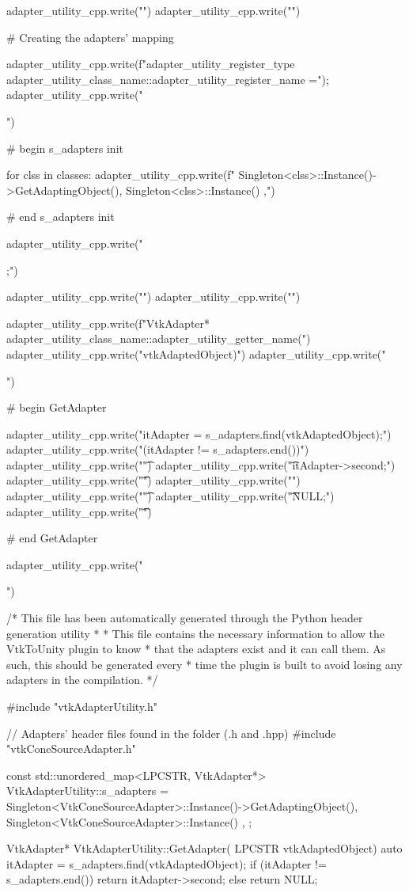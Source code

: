 \begin{appendices}
\begin{python}[label=lst:generateheader,caption={generate-header.py script},aboveskip=20pt]
adapter_utility_cpp.write("\n")
adapter_utility_cpp.write("\n")

# Creating the adapters' mapping

adapter_utility_cpp.write(f"{adapter_utility_register_type} {adapter_utility_class_name}::{adapter_utility_register_name} =");
adapter_utility_cpp.write("{\n")

# begin s_adapters init

for clss in classes:    
    adapter_utility_cpp.write(f"\t{{ Singleton<{clss}>::Instance()->GetAdaptingObject(), Singleton<{clss}>::Instance() }},\n")

# end s_adapters init

adapter_utility_cpp.write("};\n")

adapter_utility_cpp.write("\n")
adapter_utility_cpp.write("\n")

adapter_utility_cpp.write(f"VtkAdapter* {adapter_utility_class_name}::{adapter_utility_getter_name}(\n")
adapter_utility_cpp.write("\tLPCSTR vtkAdaptedObject)\n")
adapter_utility_cpp.write("{\n")

# begin GetAdapter

adapter_utility_cpp.write("\tauto itAdapter = s_adapters.find(vtkAdaptedObject);\n")
adapter_utility_cpp.write("\tif (itAdapter != s_adapters.end())\n")
adapter_utility_cpp.write("\t{\n")
adapter_utility_cpp.write("\t\treturn itAdapter->second;\n")
adapter_utility_cpp.write("\t}\n")
adapter_utility_cpp.write("\telse\n")
adapter_utility_cpp.write("\t{\n")
adapter_utility_cpp.write("\t\treturn NULL;\n")
adapter_utility_cpp.write("\t}\n")

# end GetAdapter

adapter_utility_cpp.write("}\n")
\end{python}
    
\begin{cpp}[label=lst:vtkadapterutilityex,caption={Example VtkAdapterUtility.cpp},aboveskip=20pt]
/* This file has been automatically generated through the Python header generation utility
 * 
 * This file contains the necessary information to allow the VtkToUnity plugin to know
 * that the adapters exist and it can call them. As such, this should be generated every
 * time the plugin is built to avoid losing any adapters in the compilation.
 */


#include "vtkAdapterUtility.h"

// Adapters' header files found in the folder (.h and .hpp)
#include "vtkConeSourceAdapter.h"


const std::unordered_map<LPCSTR, VtkAdapter*> VtkAdapterUtility::s_adapters ={
	{ Singleton<VtkConeSourceAdapter>::Instance()->GetAdaptingObject(), Singleton<VtkConeSourceAdapter>::Instance() },
};


VtkAdapter* VtkAdapterUtility::GetAdapter(
	LPCSTR vtkAdaptedObject)
{
	auto itAdapter = s_adapters.find(vtkAdaptedObject);
	if (itAdapter != s_adapters.end())
	{
		return itAdapter->second;
	}
	else
	{
		return NULL;
	}
}
\end{cpp}
    
\end{appendices}